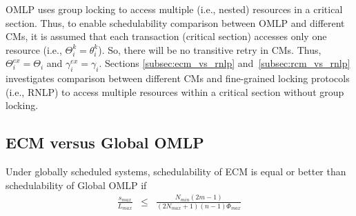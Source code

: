 OMLP uses group locking to access multiple (i.e., nested) resources
in a critical section. Thus, to enable schedulability comparison between
OMLP and different CMs, it is assumed that each transaction (critical
section) accesses only one resource (i.e., $\Theta_i^k=\theta_i^k$). So, there will be no transitive retry in CMs. Thus, $\Theta_i^{ex}=\Theta_i$ and $\gamma_i^{ex}=\gamma_i$. Sections \ref{subsec:ecm_vs_rnlp} and~\ref{subsec:rcm_vs_rnlp} investigates comparison between different CMs and fine-grained locking protocols (i.e., RNLP) to access multiple resources within a critical section without group locking.
%
\subsection{ECM versus Global OMLP}\label{subsec:ecm_vs_omlp}
%
\begin{clm}\label{clm:ecm_vs_omlp}
%
Under globally scheduled systems, schedulability of ECM is equal or
better than schedulability of Global OMLP if 
\begin{eqnarray}
\frac{s_{max}}{L_{max}} & \le & \frac{N_{min}\left(2m-1\right)}{\left(2N_{max}+1\right)(n-1)\Phi_{max}}\label{eq:ecm_omlp_cmp_final}
\end{eqnarray}
%
\end{clm}
%
